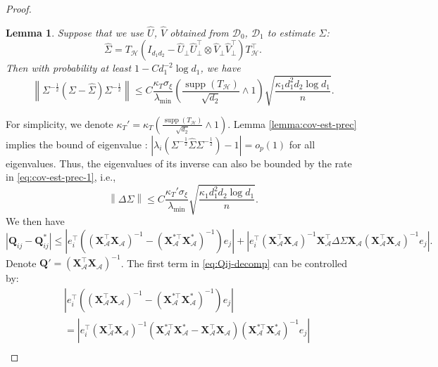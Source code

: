 \documentclass[12pt]{article}
\newcommand{\abs}[1]{\left\lvert#1\right\rvert}
\newcommand{\norm}[1]{\left\lVert#1\right\rVert}
\newcommand{\cD}{\mathcal{D}}
\def\calH{{\mathcal H}}
\newtheorem{Lemma}{Lemma}
\theoremstyle{plain}
\begin{document}
\begin{proof}
\begin{Lemma}
    Suppose that we use $\widehat{U}$, $\widehat{V}$ obtained from $\cD_0$, $\cD_1$ to estimate $\Sigma$: 
    $$\widehat{\Sigma}= T_{\calH}(I_{d_1 d_2} - \widehat U_\perp \widehat U_\perp^\top \otimes \widehat V_\perp \widehat V_\perp^\top  ) T_{\calH}^\top. $$ 
    Then with probability at least $1-Cd_1^{-2}\log d_1 $, we have 
    \begin{equation}\label{eq:cov-est-prec-1}
        \norm{\Sigma^{-\frac{1}{2} }(\Sigma-\widehat{\Sigma})\Sigma^{-\frac{1}{2} } }\le C\frac{\kappa_T \sigma_\xi }{\lambda_{\min} }\left( \frac{\operatorname{supp}(T_{\calH} )}{\sqrt{d_2}}\wedge 1 \right)  \sqrt{\frac{ \kappa_1  d_1^2 d_2 \log d_1 }{n}}.
    \end{equation}
\end{Lemma}
For simplicity, we denote $\kappa_T' = \kappa_T\left( \frac{\operatorname{supp}(T_{\calH} )}{\sqrt{d_2}}\wedge 1 \right)  $. Lemma \ref{lemma:cov-est-prec} implies the bound of eigenvalue : $\abs{\lambda_i(\Sigma^{-\frac{1}{2} }\widehat{\Sigma} \Sigma^{-\frac{1}{2} } )-1}=o_p(1)$ for all eigenvalues. Thus, the  eigenvalues of its inverse can also be bounded by the rate in \eqref{eq:cov-est-prec-1}, i.e.,
\begin{equation*}
    \norm{\Delta \Sigma}\le C\frac{\kappa_T' \sigma_\xi }{\lambda_{\min} }\sqrt{\frac{ \kappa_1  d_1^2 d_2 \log d_1 }{n}}.
\end{equation*}
We then have
\begin{equation}\label{eq:Qij-decomp}
    \abs{\mathbf{Q}_{ij}- \mathbf{Q}_{ij}^*} \le \abs{e_i^\top \left( \left(\mathbf{X}_{\mathcal{A}}^{\top} \mathbf{X}_{\mathcal{A}}\right)^{-1}-\left(\mathbf{X}_{\mathcal{A}}^{*\top} \mathbf{X}_{\mathcal{A}}^*\right)^{-1}\right)e_j} + \abs{e_i^\top \left(\mathbf{X}_{\mathcal{A}}^{\top} \mathbf{X}_{\mathcal{A}}\right)^{-1}\mathbf{X}_{\mathcal{A}}^{\top} \Delta \Sigma \mathbf{X}_{\mathcal{A}}\left(\mathbf{X}_{\mathcal{A}}^{\top} \mathbf{X}_{\mathcal{A}}\right)^{-1}e_j}.
\end{equation}
Denote $\mathbf{Q}'= \left(\mathbf{X}_{\mathcal{A}}^{\top} \mathbf{X}_{\mathcal{A}}\right)^{-1} $. The first term in \eqref{eq:Qij-decomp} can be controlled by:
\begin{equation}\label{eq:}
   \begin{aligned}
      &\abs{e_i^\top \left( \left(\mathbf{X}_{\mathcal{A}}^{\top} \mathbf{X}_{\mathcal{A}}\right)^{-1}-\left(\mathbf{X}_{\mathcal{A}}^{*\top} \mathbf{X}_{\mathcal{A}}^*\right)^{-1}\right)e_j} \\
    &= \abs{e_i^\top  \left(\mathbf{X}_{\mathcal{A}}^{\top} \mathbf{X}_{\mathcal{A}}\right)^{-1}\left( \mathbf{X}_{\mathcal{A}}^{*\top} \mathbf{X}_{\mathcal{A}}^* - \mathbf{X}_{\mathcal{A}}^{\top} \mathbf{X}_{\mathcal{A}}\right)\left(\mathbf{X}_{\mathcal{A}}^{*\top} \mathbf{X}_{\mathcal{A}}^*\right)^{-1}e_j} \\

\end{aligned}
\end{equation}
\end{proof}
\end{document}
